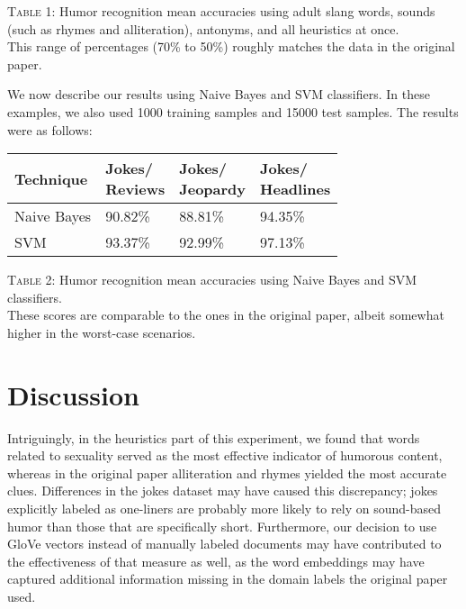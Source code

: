 \documentclass[11pt,a4paper]{article}
\begin{document}
\noindent \textsc{Table 1}: Humor recognition mean accuracies using adult slang words, sounds (such as rhymes and alliteration), antonyms, and all heuristics at once.\\

This range of percentages (70\% to 50\%) roughly matches the data in the original paper.

We now describe our results using Naive Bayes and SVM classifiers. In these examples, we also used 1000 training samples and 15000 test samples. The results were as follows:

\begin{center}
  \begin{tabular}{|p{1.5cm}|p{1.5cm}|p{1.5cm}|p{1.5cm}|}
    \hline
    Technique & \thead{Jokes/ \\ Reviews} & \thead{Jokes/ \\ Jeopardy} & \thead{Jokes/ \\ Headlines} \\
    \hline
    Naive Bayes & 90.82\% & 88.81\% & 94.35\% \\
    \hline
    SVM & 93.37\% & 92.99\% & 97.13\% \\
    \hline
\end{tabular}
\end{center}

\noindent \textsc{Table 2}: Humor recognition mean accuracies using Naive Bayes and SVM classifiers.\\

These scores are comparable to the ones in the original paper, albeit somewhat higher in the worst-case scenarios.

\section{Discussion}
Intriguingly, in the heuristics part of this experiment, we found that words related to sexuality served as the most effective indicator of humorous content, whereas in the original paper alliteration and rhymes yielded the most accurate clues. Differences in the jokes dataset may have caused this discrepancy; jokes explicitly labeled as one-liners are probably more likely to rely on sound-based humor than those that are specifically short. Furthermore, our decision to use GloVe vectors instead of manually labeled documents may have contributed to the effectiveness of that measure as well, as the word embeddings may have captured additional information missing in the domain labels the original paper used.
\end{document}
